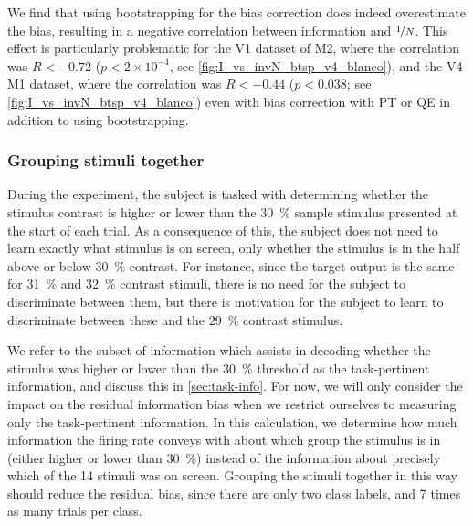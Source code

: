 We find that using bootstrapping for the bias correction does indeed overestimate the bias, resulting in a negative correlation between information and $\nicefrac{1}{N}$.
This effect is particularly problematic for the \ac{V1} dataset of \ac{M2}, where the correlation was $R<-0.72$ ($p < 2 \times 10^{-4}$, see \autoref{fig:I_vs_invN_btsp_v4_blanco}), and the \ac{V4} \ac{M1} dataset, where the correlation was $R<-0.44$ ($p<0.038$; see \autoref{fig:I_vs_invN_btsp_v4_blanco}) even with bias correction with \ac{PT} or \ac{QE} in addition to using bootstrapping.


\subsubsection{Grouping stimuli together}
\label{sec:pl_bias_grouping}

During the experiment, the subject is tasked with determining whether the stimulus contrast is higher or lower than the \SI{30}{\percent} sample stimulus presented at the start of each trial.
As a consequence of this, the subject does not need to learn exactly what stimulus is on screen, only whether the stimulus is in the half above or below \SI{30}{\percent} contrast.
For instance, since the target output is the same for \SI{31}{\percent} and \SI{32}{\percent} contrast stimuli, there is no need for the subject to discriminate between them, but there is motivation for the subject to learn to discriminate between these and the \SI{29}{\percent} contrast stimulus.

We refer to the subset of information which assists in decoding whether the stimulus was higher or lower than the \SI{30}{\percent} threshold as the task-pertinent information, and discuss this in \autoref{sec:task-info}.
For now, we will only consider the impact on the residual information bias when we restrict ourselves to measuring only the task-pertinent information.
In this calculation, we determine how much information the firing rate conveys with about which group the stimulus is in (either higher or lower than \SI{30}{\percent}) instead of the information about precisely which of the \num{14} stimuli was on screen.
Grouping the stimuli together in this way should reduce the residual bias, since there are only two class labels, and \num{7} times as many trials per class.


